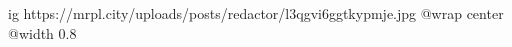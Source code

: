  
 
 
 
 

\ifcmt
  ig https://mrpl.city/uploads/posts/redactor/l3qgvi6ggtkypmje.jpg
  @wrap center
  @width 0.8
\fi
